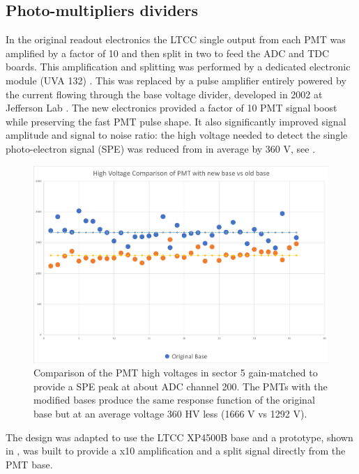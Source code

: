\subsection{Photo-multipliers dividers}

In the original readout electronics the LTCC single output from each PMT was amplified by a factor of 10
and then split in two to feed the ADC and TDC boards. This amplification and splitting was performed
by a dedicated electronic module (UVA 132) \cite{Adams:2001kk}. This was replaced by a pulse amplifier entirely powered by
the current flowing through the base voltage divider, developed in 2002 at Jefferson Lab \cite{Popov:2003mj}.
The new electronics provided a factor of 10 PMT signal boost while preserving the fast PMT pulse shape. It also significantly improved signal amplitude and
signal to noise ratio: the high voltage needed to detect the single photo-electron signal (SPE) was reduced from in average by 360 V, see .

\begin{figure}
	\centering
	\includegraphics[width=0.95\columnwidth,keepaspectratio]{img/pmtHVImprovement.png}
	\caption{Comparison of the PMT high voltages in sector 5 gain-matched to provide a SPE peak at about ADC channel 200.
            The PMTs with the modified bases produce the same response function of the original base but at an average voltage 360 HV less (1666 V vs 1292 V).}
	\label{fig:pmtHVImprovement}
\end{figure}

The design was adapted to use the LTCC XP4500B base and a prototype, shown in , was built to provide a x10
amplification and a split signal directly from the PMT base.

